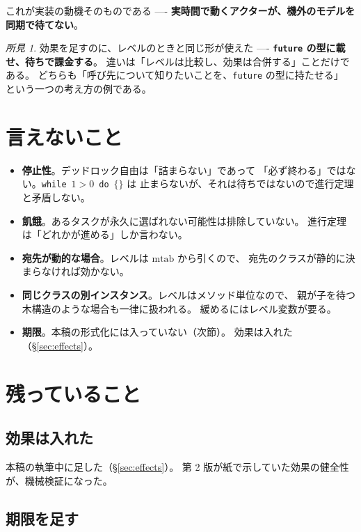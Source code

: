 \documentclass[11pt,a4paper]{ltjsarticle}
\theoremstyle{definition}
\theoremstyle{remark}
\newtheorem{finding}[theorem]{所見}
\newcommand{\mtab}{\mathrm{mtab}}
\begin{document}
これが実装の動機そのものである ----
\textbf{実時間で動くアクターが、機外のモデルを同期で待てない}。

\begin{finding}
効果を足すのに、レベルのときと同じ形が使えた ----
\textbf{\texttt{future} の型に載せ、待ちで課金する}。
違いは「レベルは比較し、効果は合併する」ことだけである。
どちらも「呼び先について知りたいことを、\texttt{future} の型に持たせる」
という一つの考え方の例である。
\end{finding}

\section{言えないこと}
\label{sec:cannot}

\begin{itemize}
\item \textbf{停止性}。デッドロック自由は「詰まらない」であって
  「必ず終わる」ではない。\texttt{while}\ $1>0$\ \texttt{do}\ $\{\}$ は
  止まらないが、それは待ちではないので進行定理と矛盾しない。
\item \textbf{飢餓}。あるタスクが永久に選ばれない可能性は排除していない。
  進行定理は「どれかが進める」しか言わない。
\item \textbf{宛先が動的な場合}。レベルは $\mtab$ から引くので、
  宛先のクラスが静的に決まらなければ効かない。
\item \textbf{同じクラスの別インスタンス}。レベルはメソッド単位なので、
  親が子を待つ木構造のような場合も一律に扱われる。
  緩めるにはレベル変数が要る。
\item \textbf{期限}。本稿の形式化には入っていない（次節）。
  効果は入れた（\S\ref{sec:effects}）。
\end{itemize}

\section{残っていること}
\label{sec:remains}

\subsection{効果は入れた}

本稿の執筆中に足した（\S\ref{sec:effects}）。
第 2 版が紙で示していた効果の健全性が、機械検証になった。

\subsection{期限を足す}
\end{document}
